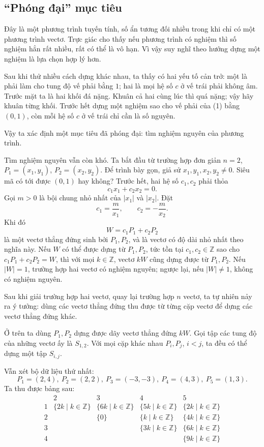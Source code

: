 \documentclass[11pt]{article}
\newcommand{\Z}{\mathbb{Z}}
\begin{document}
\subsection{``Phóng đại'' mục tiêu}

Đây là một phương trình tuyến tính, số ẩn tương đối nhiều trong khi chỉ có một
phương trình vectơ. Trực giác cho thấy nếu phương trình có nghiệm thì số
nghiệm hẳn rất nhiều, rất có thể là vô hạn. Vì vậy suy nghĩ theo hướng dựng
một nghiệm là lựa chọn hợp lý hơn.

Sau khi thử nhiều cách dựng khác nhau, ta thấy có hai yếu tố cản trở: một là
phải làm cho tung độ vế phải bằng \(1\); hai là mọi hệ số \(c\) ở vế trái phải
không âm. Trước mặt ta là hai khối đá nặng. Khuân cả hai cùng lúc thì quá
nặng; vậy hãy khuân từng khối. Trước hết dựng một nghiệm sao cho vế phải của
(1) bằng \((0,1)\), còn mỗi hệ số \(c\) ở vế trái chỉ cần là số nguyên.

Vậy ta xác định một mục tiêu đã phóng đại: tìm nghiệm nguyên của phương trình.

Tìm nghiệm nguyên vẫn còn khó. Ta bắt đầu từ trường hợp đơn giản
\(n=2\), \(P_1=(x_1,y_1)\), \(P_2=(x_2,y_2)\). Để trình bày gọn, giả sử
\(x_1,y_1,x_2,y_2\ne 0\). Siêu mã có tới được \((0,1)\) hay không?
Trước hết, hai hệ số \(c_1,c_2\) phải thỏa
\[
  c_1x_1+c_2x_2=0.
\]
Gọi \(m>0\) là bội chung nhỏ nhất của \(|x_1|\) và \(|x_2|\). Đặt
\[
  c_1=\frac{m}{x_1},\qquad c_2=-\frac{m}{x_2}.
\]
Khi đó
\[
  W=c_1P_1+c_2P_2
\]
là một vectơ thẳng đứng sinh bởi \(P_1,P_2\), và là vectơ có độ dài nhỏ nhất
theo nghĩa này. Nếu \(W\) có thể được dựng từ \(P_1,P_2\), tức tồn tại
\(c_1,c_2\in\Z\) sao cho \(c_1P_1+c_2P_2=W\), thì với mọi \(k\in\Z\), vectơ
\(kW\) cũng dựng được từ \(P_1,P_2\). Nếu \(|W|=1\), trường hợp hai vectơ có
nghiệm nguyên; ngược lại, nếu \(|W|\ne 1\), không có nghiệm nguyên.

Sau khi giải trường hợp hai vectơ, quay lại trường hợp \(n\) vectơ, ta tự
nhiên nảy ra ý tưởng: dùng các vectơ thẳng đứng thu được từ từng cặp vectơ để
dựng các vectơ thẳng đứng khác.

Ở trên ta dùng \(P_1,P_2\) dựng được dãy vectơ thẳng đứng \(kW\). Gọi tập các
tung độ của những vectơ ấy là \(S_{1,2}\). Với mọi cặp khác nhau
\(P_i,P_j\), \(i<j\), ta đều có thể dựng một tập \(S_{i,j}\).

Vẫn xét bộ dữ liệu thứ nhất:
\[
P_1=(2,4),\ P_2=(2,2),\ P_3=(-3,-3),\ P_4=(4,3),\ P_5=(1,3).
\]
Ta thu được bảng sau:
\[
\begin{array}{c|cccc}
 &2&3&4&5\\ \hline
1&\{2k\mid k\in\Z\}&\{6k\mid k\in\Z\}&\{5k\mid k\in\Z\}&\{2k\mid k\in\Z\}\\
2&&\{0\}&\{k\mid k\in\Z\}&\{4k\mid k\in\Z\}\\
3&&&\{3k\mid k\in\Z\}&\{6k\mid k\in\Z\}\\
4&&&&\{9k\mid k\in\Z\}
\end{array}
\]
\end{document}
